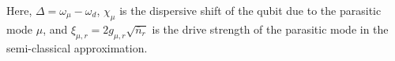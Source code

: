 \documentclass[prx,showpacs,notitlepage,twocolumn,superscriptaddress,nofootinbib,preprintnumbers,floatfix]{revtex4-2}
\begin{document}
Here, $\Delta=\omega_\mu-\omega_d$, $\chi_\mu$ is the dispersive shift of the qubit due to the parasitic mode $\mu$, and $\xi_{\mu,r}=2g_{\mu,r}\sqrt{\bar n_r}$ is the drive strength of the parasitic mode in the semi-classical approximation. 





\end{document}
